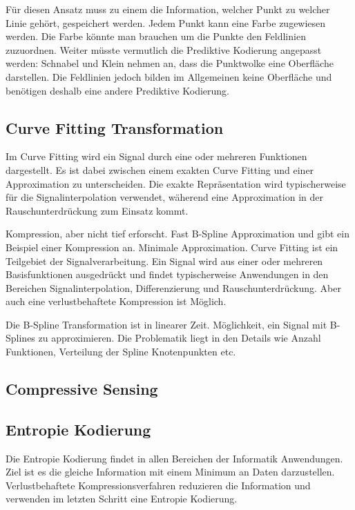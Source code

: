 Für diesen Ansatz muss zu einem die Information, welcher Punkt zu welcher Linie gehört, gespeichert werden. Jedem Punkt kann eine Farbe zugewiesen werden. Die Farbe könnte man brauchen um die Punkte den Feldlinien zuzuordnen. Weiter müsste vermutlich die Prediktive Kodierung angepasst werden: Schnabel und Klein nehmen an, dass die Punktwolke eine Oberfläche darstellen. Die Feldlinien jedoch bilden im Allgemeinen keine Oberfläche und benötigen deshalb eine andere Prediktive Kodierung.

\subsection{Curve Fitting Transformation}
Im Curve Fitting wird ein Signal durch eine oder mehreren Funktionen dargestellt. Es ist dabei zwischen einem exakten Curve Fitting und einer Approximation zu unterscheiden. Die exakte Repräsentation wird typischerweise für die Signalinterpolation verwendet, wäherend eine Approximation in der Rauschunterdrückung zum Einsatz kommt. 

Kompression, aber nicht tief erforscht. Fast B-Spline Approximation und gibt ein Beispiel einer Kompression an.
Minimale Approximation.
Curve Fitting ist ein Teilgebiet der Signalverarbeitung. Ein Signal wird aus einer oder mehreren Basisfunktionen ausgedrückt und findet typischerweise Anwendungen in den Bereichen Signalinterpolation, Differenzierung und Rauschunterdrückung. Aber auch eine verlustbehaftete Kompression ist Möglich.

Die B-Spline Transformation \cite{unser1993b:spline} ist in linearer Zeit. Möglichkeit, ein Signal mit B-Splines zu approximieren. Die Problematik liegt in den Details wie Anzahl Funktionen, Verteilung der Spline Knotenpunkten etc.

\subsection{Compressive Sensing}


\subsection{Entropie Kodierung}
Die Entropie Kodierung findet in allen Bereichen der Informatik Anwendungen. Ziel ist es die gleiche Information mit einem Minimum an Daten darzustellen. Verlustbehaftete Kompressionsverfahren reduzieren die Information und verwenden im letzten Schritt eine Entropie Kodierung.

